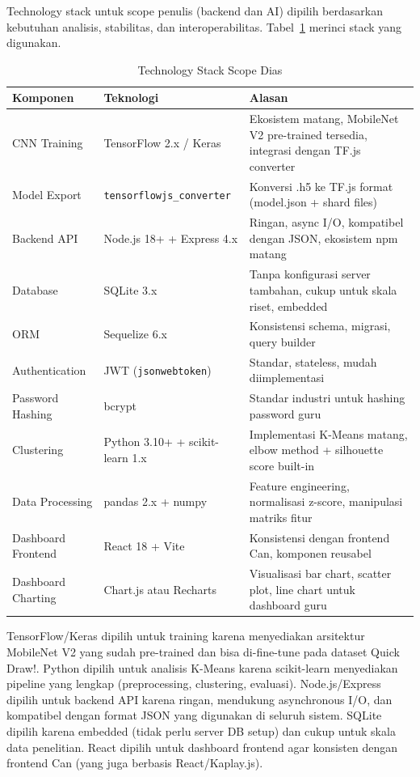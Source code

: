 \documentclass[12pt,a4paper,oneside,openany]{report}
\begin{document}
Technology stack untuk scope penulis (backend dan AI) dipilih berdasarkan kebutuhan analisis, stabilitas, dan interoperabilitas. Tabel~\ref{tab:tech-stack-dias} merinci stack yang digunakan.

\begin{table}[H]
\centering
\caption{Technology Stack Scope Dias}
\label{tab:tech-stack-dias}
\begin{tabular}{|p{3.5cm}|p{3.5cm}|p{6cm}|}
\hline
\textbf{Komponen} & \textbf{Teknologi} & \textbf{Alasan} \\ \hline
CNN Training & TensorFlow 2.x / Keras & Ekosistem matang, MobileNet V2 pre-trained tersedia, integrasi dengan TF.js converter \\ \hline
Model Export & \texttt{tensorflowjs\_converter} & Konversi .h5 ke TF.js format (model.json + shard files) \\ \hline
Backend API & Node.js 18+ + Express 4.x & Ringan, async I/O, kompatibel dengan JSON, ekosistem npm matang \\ \hline
Database & SQLite 3.x & Tanpa konfigurasi server tambahan, cukup untuk skala riset, embedded \\ \hline
ORM & Sequelize 6.x & Konsistensi schema, migrasi, query builder \\ \hline
Authentication & JWT (\texttt{jsonwebtoken}) & Standar, stateless, mudah diimplementasi \\ \hline
Password Hashing & bcrypt & Standar industri untuk hashing password guru \\ \hline
Clustering & Python 3.10+ + scikit-learn 1.x & Implementasi K-Means matang, elbow method + silhouette score built-in \\ \hline
Data Processing & pandas 2.x + numpy & Feature engineering, normalisasi z-score, manipulasi matriks fitur \\ \hline
Dashboard Frontend & React 18 + Vite & Konsistensi dengan frontend Can, komponen reusabel \\ \hline
Dashboard Charting & Chart.js atau Recharts & Visualisasi bar chart, scatter plot, line chart untuk dashboard guru \\ \hline
\end{tabular}
\end{table}

TensorFlow/Keras dipilih untuk training karena menyediakan arsitektur MobileNet V2 yang sudah pre-trained dan bisa di-fine-tune pada dataset Quick Draw!. Python dipilih untuk analisis K-Means karena scikit-learn menyediakan pipeline yang lengkap (preprocessing, clustering, evaluasi). Node.js/Express dipilih untuk backend API karena ringan, mendukung asynchronous I/O, dan kompatibel dengan format JSON yang digunakan di seluruh sistem. SQLite dipilih karena embedded (tidak perlu server DB setup) dan cukup untuk skala data penelitian. React dipilih untuk dashboard frontend agar konsisten dengan frontend Can (yang juga berbasis React/Kaplay.js).
\end{document}
